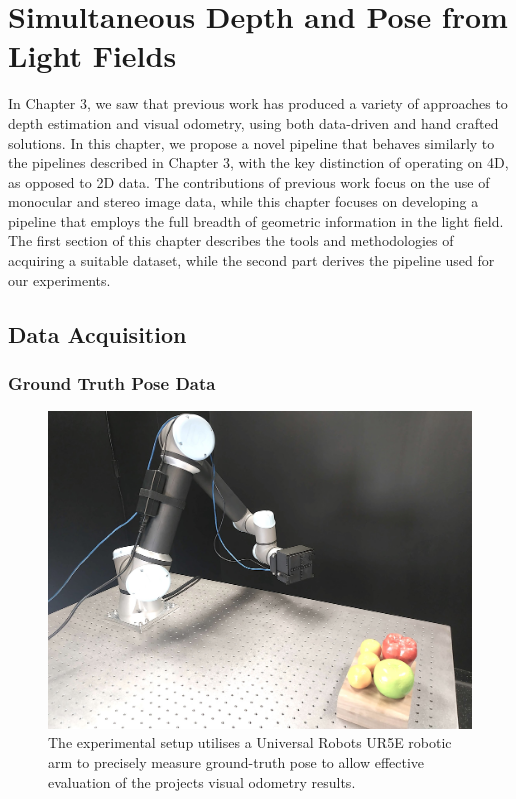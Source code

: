 \chapter{Simultaneous Depth and Pose from Light Fields}

In Chapter 3, we saw that previous work has produced a variety of approaches to depth estimation and visual odometry, using both data-driven and hand crafted solutions. In this chapter, we propose a novel pipeline that behaves similarly to the pipelines described in Chapter 3, with the key distinction of operating on 4D, as opposed to 2D data. The contributions of previous work focus on the use of monocular and stereo image data, while this chapter focuses on developing a pipeline that employs the full breadth of geometric information in the light field. The first section of this chapter describes the tools and methodologies of acquiring a suitable dataset, while the second part derives the pipeline used for our experiments.

\section{Data Acquisition}

\subsection{Ground Truth Pose Data}

\begin{figure}[h]
    \centering 
    \includegraphics[width=4.5in]{images/experimentalsetup2.jpg}
    \caption{The experimental setup utilises a Universal Robots UR5E robotic arm to precisely measure ground-truth pose to allow effective evaluation of the projects visual odometry results.}
\end{figure}

